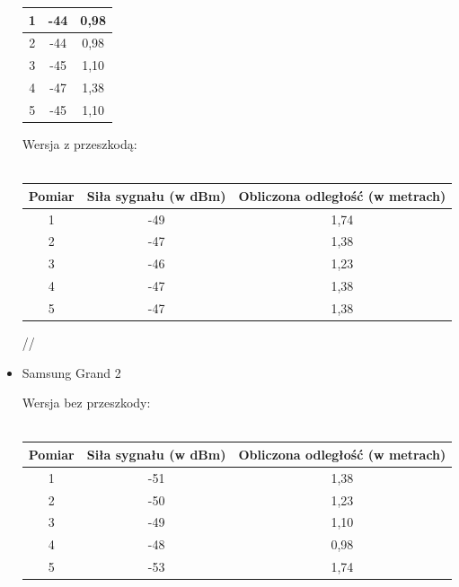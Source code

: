 \documentclass{article}
\begin{document}
\begin{itemize}
\begin{center}
\begin{minipage}{\linewidth}
\begin{tabular}{|c|c|c|}
						\hline 
						1 & -44 & 0,98 \\ 
						\hline 
						2 & -44 & 0,98 \\ 
						\hline 
						3 & -45 & 1,10 \\ 
						\hline 
						4 & -47 & 1,38 \\ 
						\hline 
						5 & -45 & 1,10 \\ 
						\hline 
					\end{tabular} 
				\end{minipage} 
			\end{center}
			\begin{center}
				\begin{minipage}{\linewidth}
					Wersja z przeszkodą:\\\\
					\begin{tabular}{|c|c|c|}
						\hline 
						Pomiar & Siła sygnału (w dBm) & Obliczona odległość (w metrach) \\ 
						\hline 
						1 & -49 & 1,74 \\ 
						\hline 
						2 & -47 & 1,38 \\ 
						\hline 
						3 & -46 & 1,23 \\ 
						\hline 
						4 & -47 & 1,38 \\ 
						\hline 
						5 & -47 & 1,38 \\ 
						\hline 
					\end{tabular}//
				\end{minipage} 
			\end{center}
		\item Samsung Grand 2
		\begin{center}
			\begin{minipage}{\linewidth}
				Wersja bez przeszkody:\\\\
				\begin{tabular}{|c|c|c|}
					\hline 
					Pomiar & Siła sygnału (w dBm) & Obliczona odległość (w metrach) \\ 
					\hline 
					1 & -51 & 1,38 \\ 
					\hline 
					2 & -50 & 1,23 \\ 
					\hline 
					3 & -49 & 1,10 \\ 
					\hline 
					4 & -48 & 0,98 \\ 
					\hline 
					5 & -53 & 1,74 \\ 
					\hline 
				\end{tabular} 
			\end{minipage} 

\end{center}
\end{itemize}
\end{document}

